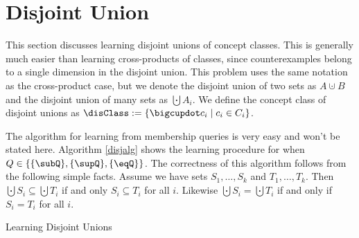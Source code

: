 \section{Disjoint Union}
This section discusses learning disjoint unions of concept classes. 
This is generally much easier than learning cross-products of classes, since counterexamples belong to a single dimension in the disjoint union. 
This problem uses the same notation as the cross-product case, but we denote the disjoint union of two sets as $A \cupdot B$ and the disjoint union of many sets as $\bigcupdot A_i$.  
We define the concept class of disjoint unions as $\disClass := \{ \bigcupdot c_i \mid c_i \in C_i  \}$. 

The algorithm for learning from membership queries is very easy and won't be stated here. 
Algorithm \ref{disjalg} shows the learning procedure for when $Q \in \{ \{\subQ\}, \{\supQ\}, \{\eqQ\}\}$.
The correctness of this algorithm follows from the following simple facts.
Assume we have sets $S_1,\dots,S_k$ and $T_1,\dots,T_k$.
Then $\bigcupdot S_i \subseteq \bigcupdot T_i$ if and only $S_i \subseteq T_i$ for all $i$.
Likewise $\bigcupdot S_i = \bigcupdot T_i$ if and only if $S_i = T_i$ for all $i$.



\begin{algorithm}[H]
\label{disjalg}
\SetAlgoLined
{}
\;
\caption{Learning Disjoint Unions}
\end{algorithm}



